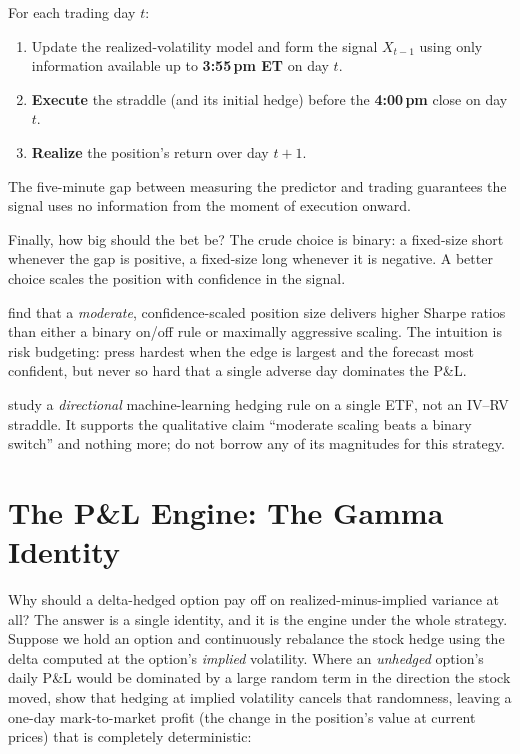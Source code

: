 \begin{keyidea}
For each trading day $t$:
\begin{enumerate}
  \item Update the realized-volatility model and form the signal $X_{t-1}$ using only information available up to \textbf{3:55\,pm ET} on day $t$.
  \item \textbf{Execute} the straddle (and its initial hedge) before the \textbf{4:00\,pm} close on day $t$.
  \item \textbf{Realize} the position's return over day $t+1$.
\end{enumerate}
The five-minute gap between measuring the predictor and trading guarantees the signal uses no information from the moment of execution onward.
\end{keyidea}

Finally, how big should the bet be? The crude choice is binary: a fixed-size short whenever the gap is positive, a fixed-size long whenever it is negative. A better choice scales the position with confidence in the signal.

\begin{keyidea}
\citet{LiWu2026} find that a \emph{moderate}, confidence-scaled position size delivers higher Sharpe ratios than either a binary on/off rule or maximally aggressive scaling. The intuition is risk budgeting: press hardest when the edge is largest and the forecast most confident, but never so hard that a single adverse day dominates the P\&L.
\end{keyidea}

\begin{warning}
\citet{LiWu2026} study a \emph{directional} machine-learning hedging rule on a single ETF, not an IV--RV straddle. It supports the qualitative claim ``moderate scaling beats a binary switch'' and nothing more; do not borrow any of its magnitudes for this strategy.
\end{warning}

\section{The P\&L Engine: The Gamma Identity}
\label{sec:ivrv:pnl-engine}

Why should a delta-hedged option pay off on realized-minus-implied variance at all? The answer is a single identity, and it is the engine under the whole strategy. Suppose we hold an option and continuously rebalance the stock hedge using the delta computed at the option's \emph{implied} volatility. Where an \emph{unhedged} option's daily P\&L would be dominated by a large random term in the direction the stock moved, \citet{AhmadWilmott2005} show that hedging at implied volatility cancels that randomness, leaving a one-day mark-to-market profit (the change in the position's value at current prices) that is completely deterministic:

